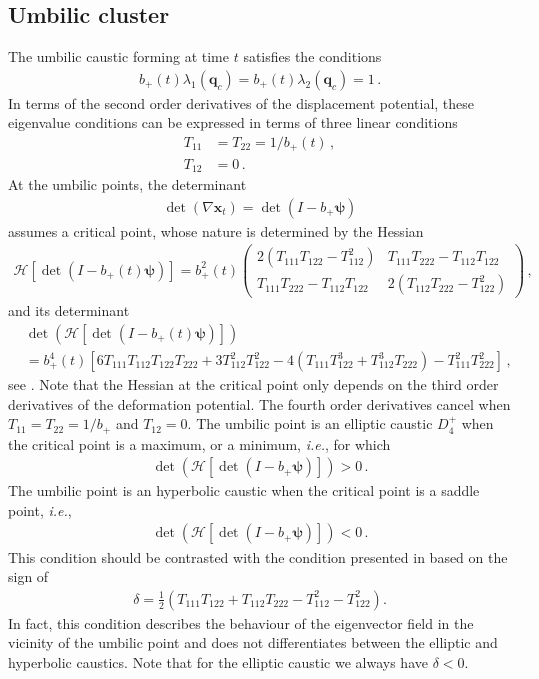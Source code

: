 \documentclass[a4paper, 11pt]{article}
\begin{document}
\subsection{Umbilic cluster}
The umbilic caustic forming at time $t$ satisfies the conditions
\begin{align}
b_+(t) \lambda_1(\bm{q}_c) = b_+(t) \lambda_2(\bm{q}_c) = 1\,.
\end{align}
In terms of the second order derivatives of the displacement potential, these eigenvalue conditions can be expressed in terms of three linear conditions
\begin{align}
T_{11}&=T_{22}=1/b_+(t)\,,\\
T_{12}&=0\,.
\end{align}
At the umbilic points, the determinant 
\begin{align}
\det(\nabla \bm{x}_t) = \det (I- b_+ \bm{\psi})
\end{align}
assumes a critical point, whose nature is determined by the Hessian
\begin{align}
\mathcal{H}\left[\det (I- b_+(t) \bm{\psi})\right] =
b_+^2(t)\begin{pmatrix} 
2(T_{111}T_{122} -T_{112}^2) & T_{111}T_{222}-T_{112}T_{122} \\
T_{111}T_{222}-T_{112}T_{122} & 2(T_{112}T_{222}-T_{122}^2)
\end{pmatrix}\,,
\end{align}
and its determinant
\begin{align}
&\det\left( \mathcal{H}\left[\det (I- b_+(t) \bm{\psi})\right]\right) \nonumber\\
&=b_+^4(t)\left[
 6 T_{111} T_{112} T_{122} T_{222} + 3 T_{112}^2 T_{122}^2  - 4 (T_{111} T_{122}^3 + T_{112}^3 T_{222})  - T_{111}^2 T_{222}^2\right]\,,
\end{align}
see \cite{Rozhanskii:1984}. Note that the Hessian at the critical point only depends on the third order derivatives of the deformation potential. The fourth order derivatives cancel when $T_{11}=T_{22}=1/b_+$ and $T_{12}=0$. The umbilic point is an elliptic caustic $D_4^+$ when the critical point is a maximum, or a minimum, \textit{i.e.}, for which 
\begin{align}
\det (\mathcal{H}\left[\det (I- b_+ \bm{\psi})\right]) >0\,.
\end{align}
The umbilic point is an hyperbolic caustic when the critical point is a saddle point, \textit{i.e.},
\begin{align}
\det (\mathcal{H}\left[\det (I- b_+ \bm{\psi})\right]) <0\,.
\end{align}
This condition should be contrasted with the condition presented in \cite{Delmarcelle:1995, Lavin:1997, Hidding:2016, Feldbrugge:2018} based on the sign of 
\begin{align}
\delta = \frac{1}{2}(T_{111} T_{122} + T_{112} T_{222} - T_{112}^2  - T_{122}^2 ).
\end{align} 
In fact, this condition describes the behaviour of the eigenvector field in the vicinity of the umbilic point and does not differentiates between the elliptic and hyperbolic caustics. Note that for the elliptic caustic we always have $\delta <0$.
\end{document}
